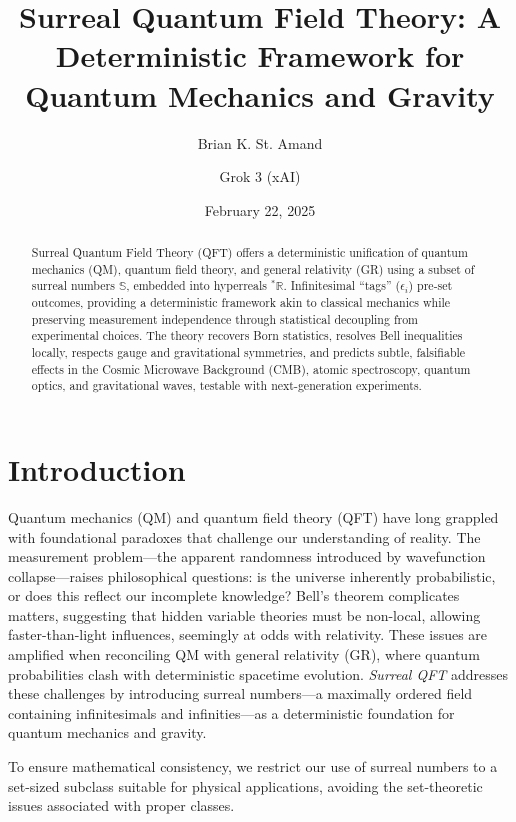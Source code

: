 \documentclass{article}
\begin{document}
\title{Surreal Quantum Field Theory: A Deterministic Framework for Quantum Mechanics and Gravity}
\author{Brian K. St. Amand \and Grok 3 (xAI)}
\date{February 22, 2025}
\maketitle

\begin{abstract}
Surreal Quantum Field Theory (QFT) offers a deterministic unification of quantum mechanics (QM), quantum field theory, and general relativity (GR) using a subset of surreal numbers \(\mathbb{S}\), embedded into hyperreals \({}^*\mathbb{R}\). Infinitesimal ``tags'' (\(\epsilon_i\)) pre-set outcomes, providing a deterministic framework akin to classical mechanics while preserving measurement independence through statistical decoupling from experimental choices. The theory recovers Born statistics, resolves Bell inequalities locally, respects gauge and gravitational symmetries, and predicts subtle, falsifiable effects in the Cosmic Microwave Background (CMB), atomic spectroscopy, quantum optics, and gravitational waves, testable with next-generation experiments.
\end{abstract}

\section{Introduction}
Quantum mechanics (QM) and quantum field theory (QFT) have long grappled with foundational paradoxes that challenge our understanding of reality. The measurement problem---the apparent randomness introduced by wavefunction collapse---raises philosophical questions: is the universe inherently probabilistic, or does this reflect our incomplete knowledge? Bell's theorem complicates matters, suggesting that hidden variable theories must be non-local, allowing faster-than-light influences, seemingly at odds with relativity. These issues are amplified when reconciling QM with general relativity (GR), where quantum probabilities clash with deterministic spacetime evolution. \textit{Surreal QFT} addresses these challenges by introducing surreal numbers---a maximally ordered field containing infinitesimals and infinities---as a deterministic foundation for quantum mechanics and gravity.

To ensure mathematical consistency, we restrict our use of surreal numbers to a set-sized subclass suitable for physical applications, avoiding the set-theoretic issues associated with proper classes.
\end{document}
